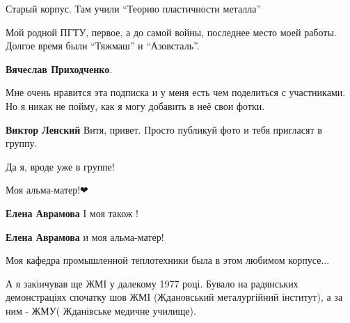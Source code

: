  
 
 
 
 

\qqSecCmt


Старый корпус. Там учили \enquote{Теорию пластичности металла}


Мой родной ПГТУ, первое, а до самой войны, последнее место моей работы. Долгое
время были \enquote{Тяжмаш} и \enquote{Азовсталь}.

\begin{itemize} %
\textbf{Вячеслав Приходченко}. 

Мне очень нравится эта подписка и у меня есть чем поделиться с участниками. Но
я никак не пойму, как я могу добавить в неё свои фотки.

\textbf{Виктор Ленский} Витя, привет. Просто публикуй фото и тебя пригласят в группу.

Да я, вроде уже в группе!

\end{itemize} %


Моя альма-матер!❤

\begin{itemize} %
\textbf{Елена Аврамова} І моя також !

\textbf{Елена Аврамова} и моя альма-матер!
\end{itemize} %


Моя кафедра промышленной теплотехники была в этом любимом корпусе...


А я закінчував ще ЖМІ у далекому 1977 році. Бувало на радянських демонстраціях
спочатку шов ЖМІ (Ждановський металургійний інститут), а за ним - ЖМУ(
Жданівське медичне училище).
